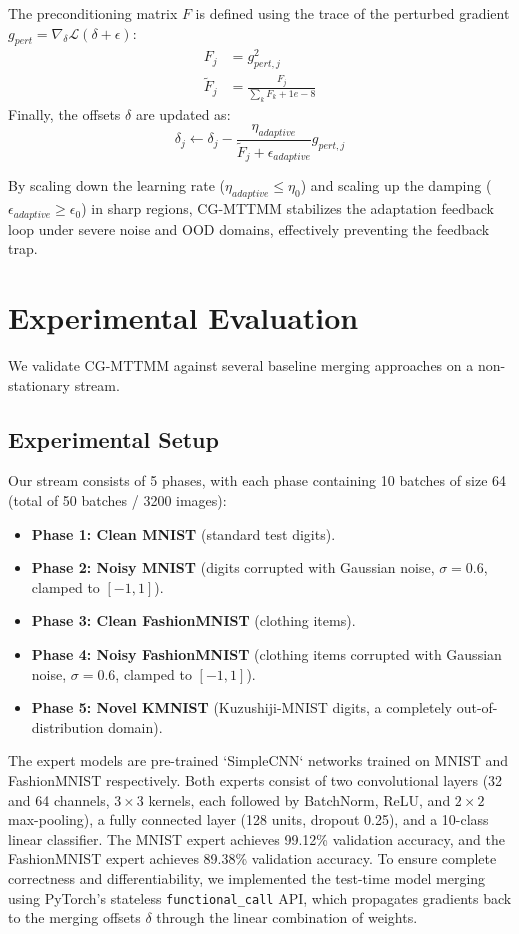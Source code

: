 \documentclass{article}
\theoremstyle{plain}
\theoremstyle{definition}
\theoremstyle{remark}
\begin{document}
The preconditioning matrix $F$ is defined using the trace of the perturbed gradient $g_{pert} = \nabla_{\delta} \mathcal{L}(\delta + \epsilon)$:
\begin{align}
F_j &= g_{pert, j}^2 \\
\tilde{F}_j &= \frac{F_j}{\sum_k F_k + 1e-8}
\end{align}
Finally, the offsets $\delta$ are updated as:
\begin{equation}
\delta_j \leftarrow \delta_j - \frac{\eta_{adaptive}}{\tilde{F}_j + \epsilon_{adaptive}} g_{pert, j}
\end{equation}

By scaling down the learning rate ($\eta_{adaptive} \le \eta_0$) and scaling up the damping ($\epsilon_{adaptive} \ge \epsilon_0$) in sharp regions, CG-MTTMM stabilizes the adaptation feedback loop under severe noise and OOD domains, effectively preventing the feedback trap.

\section{Experimental Evaluation}
\label{sec:experiments}
We validate CG-MTTMM against several baseline merging approaches on a non-stationary stream.

\subsection{Experimental Setup}
Our stream consists of 5 phases, with each phase containing 10 batches of size 64 (total of 50 batches / 3200 images):
\begin{itemize}
\item \textbf{Phase 1: Clean MNIST} (standard test digits).
\item \textbf{Phase 2: Noisy MNIST} (digits corrupted with Gaussian noise, $\sigma=0.6$, clamped to $[-1, 1]$).
\item \textbf{Phase 3: Clean FashionMNIST} (clothing items).
\item \textbf{Phase 4: Noisy FashionMNIST} (clothing items corrupted with Gaussian noise, $\sigma=0.6$, clamped to $[-1, 1]$).
\item \textbf{Phase 5: Novel KMNIST} (Kuzushiji-MNIST digits, a completely out-of-distribution domain).
\end{itemize}

The expert models are pre-trained `SimpleCNN` networks trained on MNIST and FashionMNIST respectively. Both experts consist of two convolutional layers (32 and 64 channels, $3\times3$ kernels, each followed by BatchNorm, ReLU, and $2\times2$ max-pooling), a fully connected layer (128 units, dropout 0.25), and a 10-class linear classifier. The MNIST expert achieves 99.12\% validation accuracy, and the FashionMNIST expert achieves 89.38\% validation accuracy. To ensure complete correctness and differentiability, we implemented the test-time model merging using PyTorch's stateless \texttt{functional\_call} API, which propagates gradients back to the merging offsets $\delta$ through the linear combination of weights.
\end{document}
